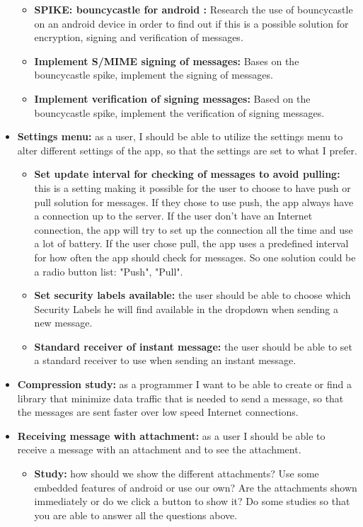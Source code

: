 \begin{itemize}
\begin{itemize}
\item{}\textbf{SPIKE: bouncycastle for android :} Research the use of bouncycastle on an android device in order to find out if this is a possible solution for encryption, signing and verification of messages.
\item{}\textbf{Implement S/MIME signing of messages:} Bases on the bouncycastle spike, implement the signing of messages. 
\item{}\textbf{Implement verification of signing messages:} Based on the bouncycastle spike, implement the verification of signing messages.
\end{itemize}

\newpage

\item{}\textbf{Settings menu:} as a user, I should be able to utilize the settings menu to alter different settings of the app, so that the settings are set to what I prefer.
\begin{itemize}
\item{}\textbf{Set update interval for checking of messages to avoid pulling:} this is a setting making it possible for the user to choose to have push or pull solution for messages. If they chose to use push, the app always have a connection up to the server. If the user don’t have an Internet connection, the app will try to set up the connection all the time and use a lot of battery. If the user chose pull, the app uses a predefined interval for how often the app should check for messages. So one solution could be a radio button list: "Push", "Pull".
\item{}\textbf{Set security labels available:} the user should be able to choose which Security Labels he will find available in the dropdown when sending a new message.
\item{}\textbf{Standard receiver of instant message:} the user should be able to set a standard receiver to use when sending an instant message.
\end{itemize}
\item{}\textbf{Compression study:} as a programmer I want to be able to create or find a library that minimize data traffic that is needed to send a message, so that the messages are sent faster over low speed Internet connections.
\item{}\textbf{Receiving message with attachment:} as a user I should be able to receive a message with an attachment and to see the attachment.
\begin{itemize}
\item{}\textbf{Study:} how should we show the different attachments? Use some embedded features of android or use our own? Are the attachments shown immediately or do we click a button to show it? Do some studies so that you are able to answer all the questions above.

\end{itemize}
\end{itemize}
